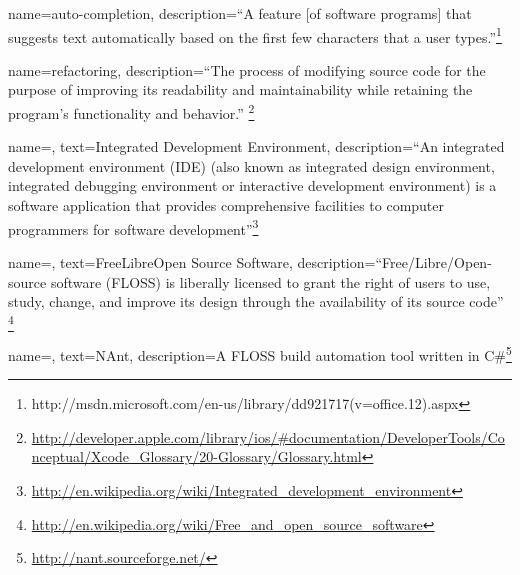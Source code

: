 
{
name=auto-completion,
description={``A feature [of software programs] that suggests text automatically based on the first few characters that a user types.''\footnote{http://msdn.microsoft.com/en-us/library/dd921717(v=office.12).aspx}}
}

{
name=refactoring,
description={``The process of modifying source code for the purpose of improving its readability and maintainability while retaining the program's functionality and behavior.'' \footnote{\url{http://developer.apple.com/library/ios/\#documentation/DeveloperTools/Conceptual/Xcode_Glossary/20-Glossary/Glossary.html}}}
}


{
name=,
text=Integrated Development Environment,
description={``An integrated development environment (IDE) (also known as integrated design environment, integrated debugging environment or interactive development environment) is a software application that provides comprehensive facilities to computer programmers for software development''\footnote{\url{http://en.wikipedia.org/wiki/Integrated_development_environment}}}
}


{
name=,
text=Free\/\-Libre\/\-Open Source Software,
description={``Free/\-Libre/\-Open-\-source software (FLOSS) is liberally licensed to grant the right of users to use, study, change, and improve its design through the availability of its source code'' \footnote{\url{http://en.wikipedia.org/wiki/Free_and_open_source_software}}}
}


{
name=,
text=NAnt,
description={A \gls{FLOSS} build automation tool written in C\#\footnote{\url{http://nant.sourceforge.net/}}}
}


